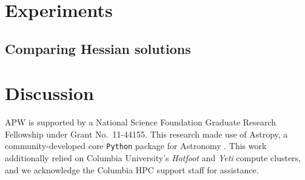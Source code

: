 \documentclass[letterpaper,12pt,preprint]{aastex}
\begin{document}

\section{Experiments}\label{sec:experiments}

\subsection{Comparing Hessian solutions}


\section{Discussion}\label{sec:discussion}

\acknowledgements
APW is supported by a National Science Foundation Graduate Research Fellowship under Grant No.\ 11-44155. 
This research made use of Astropy, a community-developed core \texttt{Python} package for Astronomy \citep{astropy13}.
This work additionally relied on Columbia University's \emph{Hotfoot} and \emph{Yeti} compute clusters, and we acknowledge the Columbia HPC support staff for assistance. \\



\end{document}
